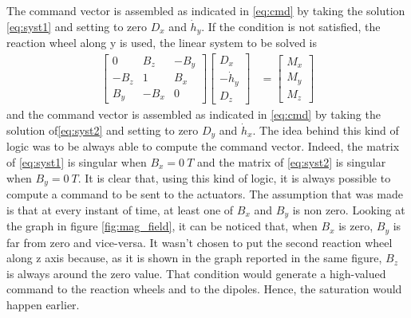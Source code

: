  The command vector is assembled as indicated in \autoref{eq:cmd} by taking the solution \autoref{eq:syst1} and setting to zero $D_x$ and $\Dot{h}_y$.  If the condition is not satisfied, the reaction wheel along y is used, the linear system to be solved is 
\begin{equation}
 \label{eq:syst2}
 \begin{aligned} 
    \begin{bmatrix}
        0 & B_z & -B_y \\
        -B_z & 1 & B_x \\
        B_y & -B_x & 0 
    \end{bmatrix}\begin{bmatrix}
        D_x \\
        -\Dot{h}_y \\
        D_z
    \end{bmatrix} &=\begin{bmatrix}
        M_x \\
        M_y \\
        M_z
    \end{bmatrix}
  \end{aligned}
\end{equation}
  and the command vector is assembled as indicated in \autoref{eq:cmd} by taking the solution of\autoref{eq:syst2} and setting to zero $D_y$ and $\Dot{h}_x$. The idea behind this kind of logic was to be always able to compute the command vector. Indeed, the matrix of \autoref{eq:syst1} is singular when $B_x=0 \ T$ and the matrix of \autoref{eq:syst2} is singular when $B_y= 0 \ T$. It is clear that, using this kind of logic, it is always possible to compute a command to be sent to the actuators. The assumption that was made is that at every instant of time, at least one of $B_x$ and $B_y$ is non zero. Looking at the graph in figure \autoref{fig:mag_field}, it can be noticed that, when $B_x$ is zero, $B_y$ is far from zero and vice-versa. It wasn't chosen to put the second reaction wheel along z axis because, as it is shown in the graph reported in the same figure, $B_z$ is always around the zero value. That condition would generate a high-valued command to the reaction wheels and to the dipoles. Hence, the saturation would happen earlier.
